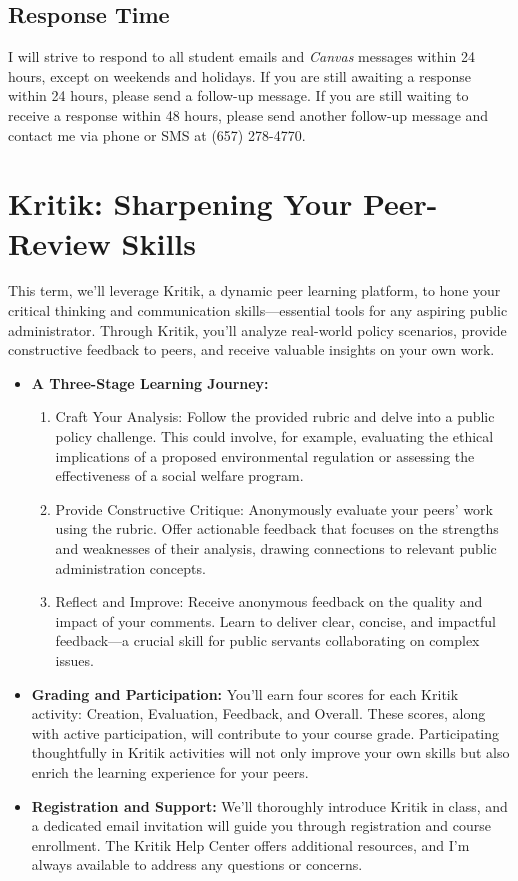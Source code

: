 \documentclass[12pt, letterpaper]{article}
\begin{document}
\subsection*{Response Time} I will strive to respond to all student emails and \emph{Canvas} messages within 24 hours, except on weekends and holidays. If you are still awaiting a response within 24 hours, please send a follow-up message. If you are still waiting to receive a response within 48 hours, please send another follow-up message and contact me via phone or SMS at (657) 278-4770.


\section*{Kritik: Sharpening Your Peer-Review Skills}

This term, we'll leverage Kritik, a dynamic peer learning platform, to hone your critical thinking and communication skills—essential tools for any aspiring public administrator. Through Kritik, you'll analyze real-world policy scenarios, provide constructive feedback to peers, and receive valuable insights on your own work.

\begin{itemize}

\item \textbf{A Three-Stage Learning Journey:}

\begin{enumerate}
    \item Craft Your Analysis: Follow the provided rubric and delve into a public policy challenge. This could involve, for example, evaluating the ethical implications of a proposed environmental regulation or assessing the effectiveness of a social welfare program.
    \item Provide Constructive Critique: Anonymously evaluate your peers' work using the rubric. Offer actionable feedback that focuses on the strengths and weaknesses of their analysis, drawing connections to relevant public administration concepts.
    \item Reflect and Improve: Receive anonymous feedback on the quality and impact of your comments. Learn to deliver clear, concise, and impactful feedback—a crucial skill for public servants collaborating on complex issues.
\end{enumerate}

\item \textbf{Grading and Participation:} You'll earn four scores for each Kritik activity: Creation, Evaluation, Feedback, and Overall. These scores, along with active participation, will contribute to your course grade. Participating thoughtfully in Kritik activities will not only improve your own skills but also enrich the learning experience for your peers.

\item \textbf{Registration and Support:} We'll thoroughly introduce Kritik in class, and a dedicated email invitation will guide you through registration and course enrollment. The Kritik Help Center offers additional resources, and I'm always available to address any questions or concerns.
\end{itemize}
\end{document}
